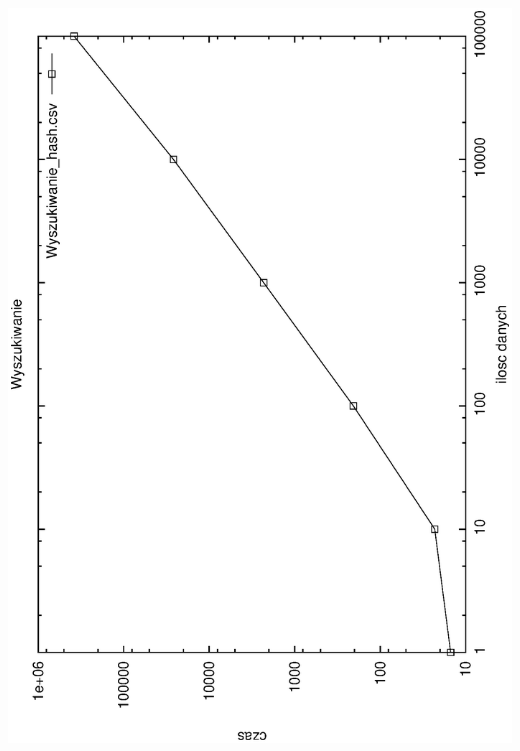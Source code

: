 \documentclass[a4paper,11pt]{report}
\begin{document}
\includegraphics[angle=270, scale = 0.5]{wykresy/wyszukiwanie_hash.eps}
\end{document}
